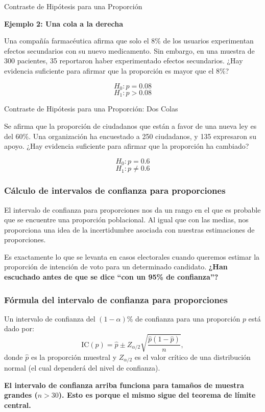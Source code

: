 \documentclass[aspectratio=169]{beamer}
\begin{document}
\begin{frame}{Contraste de Hipótesis para una Proporción}

\textbf{Ejemplo 2: Una cola a la derecha}


Una compañía farmacéutica afirma que solo el 8\% de los usuarios experimentan efectos secundarios con su nuevo medicamento. Sin embargo, en una muestra de 300 pacientes, 35 reportaron haber experimentado efectos secundarios. ¿Hay evidencia suficiente para afirmar que la proporción es mayor que el 8\%?

\[ H_0: p = 0.08 \]
\[ H_1: p > 0.08 \]

\end{frame}



\begin{frame}{Contraste de Hipótesis para una Proporción: Dos Colas}


Se afirma que la proporción de ciudadanos que están a favor de una nueva ley es del 60\%. Una organización ha encuestado a 250 ciudadanos, y 135 expresaron su apoyo. ¿Hay evidencia suficiente para afirmar que la proporción ha cambiado?

\[ H_0: p = 0.6 \]
\[ H_1: p \neq 0.6 \]

\end{frame}



\begin{frame}
\frametitle{Cálculo de intervalos de confianza para proporciones}
El intervalo de confianza para proporciones nos da un rango en el que es probable que se encuentre una proporción poblacional. Al igual que con las medias, nos proporciona una idea de la incertidumbre asociada con nuestras estimaciones de proporciones.

\vfill

Es exactamente lo que se levanta en casos electorales cuando queremos estimar la proporción de intención de voto para un determinado candidato. {\bf ¿Han escuchado antes de que se dice ``con un 95\% de confianza''?}

\end{frame}

\begin{frame}
\frametitle{Fórmula del intervalo de confianza para proporciones}
Un intervalo de confianza del \( (1-\alpha)\% \) de confianza para una proporción \( p \) está dado por:
\[ \text{IC}(p) =  \hat{p} \pm Z_{\alpha/2} \sqrt{\frac{\hat{p}(1-\hat{p})}{n}}, \]
donde \( \hat{p} \) es la proporción muestral y \( Z_{\alpha/2} \) es el valor crítico de una distribución normal (el cual dependerá del nivel de confianza).

\vfill

{\bf El intervalo de confianza arriba funciona para tamaños de muestra grandes ($n>30$). Esto es porque el mismo sigue del teorema de límite central.}


\end{frame}
\end{document}
